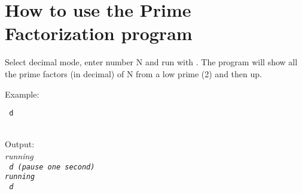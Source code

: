 \documentclass[a4paper, landscape]{article}
\begin{document}
\section{How to use the Prime Factorization program}

\bigskip
Select decimal mode, enter number N and run with \RSsic. The program will show all the prime factors (in decimal) of N from a low prime (2) and then up.

\bigskip
\noindent
Example:

\tt
\indent {} d\\
\indent \RSsic \\
\rm

\bigskip

Output:\\
\it running \rm \\
\tt {} d \indent \it (pause one second)\\
\it running \rm \\
\tt {} d \\
\rm

\bigskip
\end{document}

